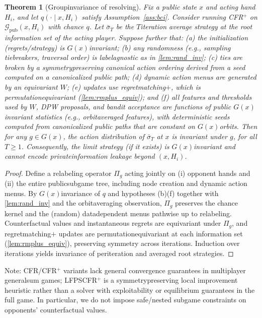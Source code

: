 \documentclass[10pt]{article}
\newcommand{\1}{\mathbf{1}}
\theoremstyle{plain}
\newtheorem{theorem}{Theorem}
\begin{document}
\begin{theorem}[Group\textendash invariance of re\textendash solving]
\label{thm:noleak_group}
Fix a public state $x$ and acting hand $H_i$, and let $q(\cdot\mid x,H_i)$ satisfy Assumption~\ref{ass:bci}. Consider running CFR$^+$ on $\mathcal{G}_{\text{pub}}(x,H_i)$ with chance $q$. Let $\bar\sigma_T$ be the $T$\textendash iteration average strategy at the root information set of the acting player. Suppose further that: (a) the initialization (regrets/strategy) is $G(x)$\textendash invariant; (b) any randomness (e.g., sampling tie\textendash breakers, traversal order) is label\textendash agnostic as in \cref{lem:rand_inv}; (c) ties are broken by a symmetry\textendash preserving canonical action ordering derived from a seed computed on a canonicalized public path; (d) dynamic action menus are generated by an equivariant $W$; (e) updates use regret\textendash matching$+$, which is permutation\textendash equivariant (\cref{lem:rmplus_equiv}); and (f) \emph{all features and thresholds used by $W$, DPW proposals, and bandit acceptance are functions of public $G(x)$\textendash invariant statistics} (e.g., orbit\textendash averaged features), with deterministic seeds computed from canonicalized public paths that are constant on $G(x)$\textendash orbits. Then for any $g\in G(x)$, the action distribution of $\bar\sigma_T$ at $x$ is invariant under $g$, for all $T\ge 1$. Consequently, the limit strategy (if it exists) is $G(x)$\textendash invariant and cannot encode private\textendash information leakage beyond $(x,H_i)$.
\end{theorem}
\begin{proof}
Define a relabeling operator $\Pi_g$ acting jointly on (i) opponent hands and (ii) the entire public\textendash subgame tree, including node creation and dynamic action menus. By $G(x)$\textendash invariance of $q$ and hypotheses (b)\textendash(f) together with \cref{lem:rand_inv} and the orbit\textendash averaging observation, $\Pi_g$ preserves the chance kernel and the (random) data\textendash dependent menus pathwise up to relabeling. Counterfactual values and instantaneous regrets are equivariant under $\Pi_g$, and regret\textendash matching$+$ updates are permutation\textendash equivariant at each information set (\cref{lem:rmplus_equiv}), preserving symmetry across iterations. Induction over iterations yields invariance of per\textendash iteration and averaged root strategies.
\end{proof}

\noindent Note: CFR/CFR$^+$ variants lack general convergence guarantees in multiplayer general\textendash sum games; LF\textendash PS\textendash CFR$^+$ is a symmetry\textendash preserving local improvement heuristic rather than a solver with exploitability or equilibrium guarantees in the full game. In particular, we do not impose safe/nested subgame constraints on opponents’ counterfactual values.
\end{document}
